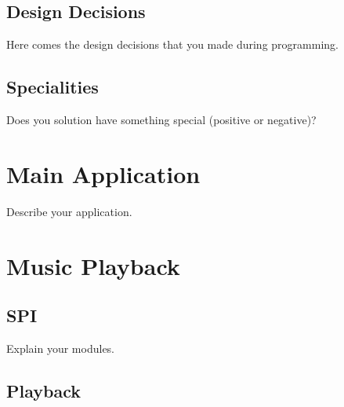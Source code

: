 \documentclass[12pt,a4paper,titlepage,oneside]{article}
\begin{document}
\subsection{Design Decisions}

Here comes the design decisions that you made during programming.

\subsection{Specialities}

Does you solution have something special (positive or negative)?


\section{Main Application}

Describe your application.





\section{Music Playback}

\subsection{SPI}

Explain your modules.

\subsection{Playback}
\end{document}
